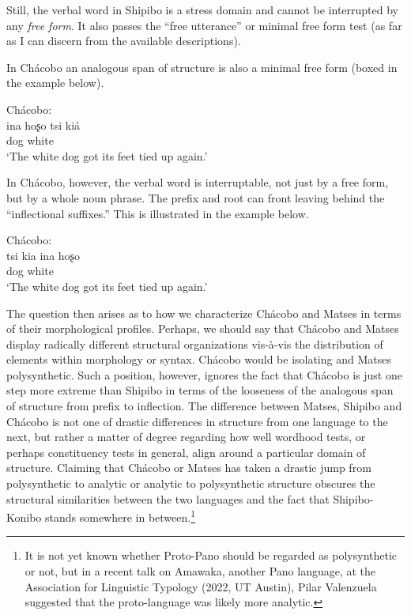 \documentclass[output=paper,hidelinks]{langscibook}
\begin{document}
Still, the verbal word in Shipibo is a stress domain and cannot be interrupted by any \textit{free form}. It also passes the ``free utterance'' or minimal free form test \citep{bloomfield1933language, hockett1958course} (as far as I can discern from the available descriptions).

In Chácobo an analogous span of structure is also a minimal free form (boxed in the example below). 

\ea
    Chácobo: \\
    \gll ina hoʂo tsi kiá  \\
    dog white \Lnk{} \Rep{}  \\
    \glt ‘The white dog got its feet tied up again.’
\z 

In Chácobo, however, the verbal word is interruptable, not just by a free form, but by a whole noun phrase. The prefix and root can front leaving behind the ``inflectional suffixes.'' This is illustrated in the example below.

\ea 
    Chácobo: \\
    \gll {} tsi kia ina hoʂo  \\
     \Lnk{} \Rep{} dog white  \\
    \glt ‘The white dog got its feet tied up again.’
\z 

The question then arises as to how we characterize Chácobo and Matses in terms of their morphological profiles. Perhaps, we should say that Chácobo and Matses display radically different structural organizations vis-à-vis the distribution of elements within morphology or syntax. Chácobo would be isolating and Matses polysynthetic. Such a position, however, ignores the fact that Chácobo is just one step more extreme than Shipibo in terms of the looseness of the analogous span of structure from prefix to inflection. The difference between Matses, Shipibo and Chácobo is not one of drastic differences in structure from one language to the next, but rather a matter of degree regarding how well wordhood tests, or perhaps constituency tests in general, align around a particular domain of structure. Claiming that Chácobo or Matses has taken a drastic jump from polysynthetic to analytic or analytic to polysynthetic structure obscures the structural similarities between the two languages and the fact that Shipibo-Konibo stands somewhere in between.\footnote{It is not yet known whether Proto-Pano should be regarded as polysynthetic or not, but in a recent talk on Amawaka, another Pano language, at the Association for Linguistic Typology (2022, UT Austin), Pilar Valenzuela suggested that the proto-language was likely more analytic.}
\end{document}
